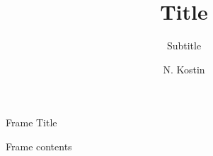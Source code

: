\documentclass{beamer}
\title{Title}
\subtitle{Subtitle}
\author{N. Kostin}
\date{}
\begin{document}
\frame{\titlepage}

\begin{frame}{Frame Title}

Frame contents

\end{frame}
\end{document}
